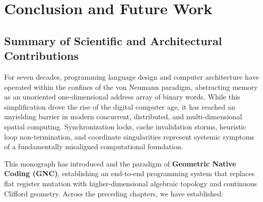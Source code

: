 \chapter{Conclusion and Future Work}
\label{ch:conclusion}

\section{Summary of Scientific and Architectural Contributions}
\label{sec:summary_contributions}

For seven decades, programming language design and computer architecture have operated within the confines of the von Neumann paradigm, abstracting memory as an unoriented one-dimensional address array of binary words. While this simplification drove the rise of the digital computer age, it has reached an unyielding barrier in modern concurrent, distributed, and multi-dimensional spatial computing. Synchronization locks, cache invalidation storms, heuristic loop non-termination, and coordinate singularities represent systemic symptoms of a fundamentally misaligned computational foundation.

This monograph has introduced \ToposLang{} and the paradigm of \textbf{Geometric Native Coding (GNC)}, establishing an end-to-end programming system that replaces flat register mutation with higher-dimensional algebraic topology and continuous Clifford geometry. Across the preceding chapters, we have established:

